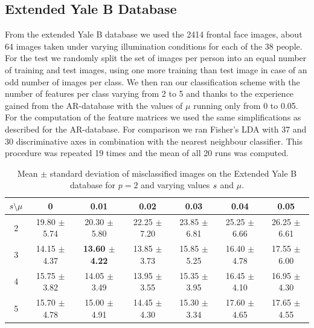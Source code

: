 \documentclass[11pt]{article}
\begin{document}
\subsection{Extended Yale B Database}
From the extended Yale B database we used the 2414 frontal face images, about 64 images taken under varying illumination conditions for each of the 38 people. For the test we randomly split the set of images per person into an equal number of training and test images, using one more training than test image in case of an odd number of images per class. We then ran our classification scheme with the number of features per class varying from 2 to 5 and thanks to the experience gained from the AR-database with the values of $\mu$ running only from 0 to 0.05. For the computation of the feature matrices we used the same simplifications as described for the AR-database. For comparison we ran Fisher's LDA with 37 and 30 discriminative axes in combination with the nearest neighbour classifier. This procedure was repeated 19 times and the mean of all 20 runs was computed. \\

\begin{table}
\centering
\begin{tabular}{|c|cccccc|}\hline
${s} \backslash \mu$ & 0 & 0.01 & 0.02 & 0.03 & 0.04 & 0.05\\ \hline
2  &  19.80 $\pm$ 5.74 &   20.30 $\pm$ 5.80 &   22.25 $\pm$ 7.20 &   23.85 $\pm$ 6.81 &   25.25 $\pm$ 6.66 &   26.25 $\pm$ 6.61\\
3  &  14.15 $\pm$ 4.37 &   {\bf 13.60 $\pm$ 4.22} &   13.85 $\pm$ 3.73 &   15.85 $\pm$ 5.25 &   16.40 $\pm$ 4.78 &   17.55 $\pm$ 6.00 \\
4  &  15.75 $\pm$ 3.82 &   14.05 $\pm$ 3.49 &   13.95 $\pm$ 3.55 &   15.35 $\pm$ 3.95 &   16.45 $\pm$ 4.10 &   16.95 $\pm$ 4.30 \\
5 &   15.70 $\pm$ 4.78 &   15.00 $\pm$ 4.91 &   14.45 $\pm$ 4.30 &   15.30 $\pm$ 3.34 &   17.60 $\pm$ 4.65 &   17.65 $\pm$ 4.55 \\ \hline
\end{tabular}
\caption{Mean $\pm$ standard deviation of misclassified images on the Extended Yale B database for $p=2$ and varying values ${s}$ and $\mu$.}
\label{tab:yalebl2}
\end{table}
\end{document}
